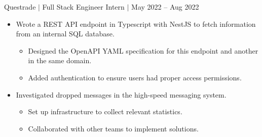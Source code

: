 \documentclass[12pt]{article}
\newcommand{\textDate}[3]{\noindent#1 $|$ #2 $|$ {\color{textGray} #3}}
\begin{document}
    \textDate{Questrade}{Full Stack Engineer Intern}{May 2022 -- Aug 2022}
    \begin{small}
        \begin{itemize}
            \itemsep0em 
            \item {\color{textGray} Wrote a REST API endpoint in Typescript with NestJS to fetch information from an internal SQL database.}
                \begin{itemize}[label=$\circ$,topsep=-5px,partopsep=0px]
                    \itemsep0em 
                    \item {\color{textGray} Designed the OpenAPI YAML specification for this endpoint and another in the same domain.}
                    \item {\color{textGray} Added authentication to ensure users had proper access permissions.}
                \end{itemize}
            \item {\color{textGray} Investigated dropped messages in the high-speed messaging system.}
                \begin{itemize}[label=$\circ$,topsep=-5px,partopsep=0px]
                    \itemsep0em 
                    \item {\color{textGray} Set up infrastructure to collect relevant statistics.}
                    \item {\color{textGray} Collaborated with other teams to implement solutions.}
                \end{itemize}
        \end{itemize}
    \end{small}
\end{document}

